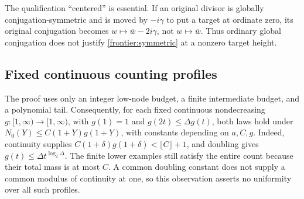 The qualification ``centered'' is essential. If an original divisor
is globally conjugation-symmetric and is moved by \(-i\gamma\)
to put a target at ordinate zero, its original conjugation becomes
\(w\mapsto\overline w-2i\gamma\), not
\(w\mapsto\overline w\). Thus ordinary global conjugation does
not justify \eqref{frontier:symmetric} at a nonzero target height.

\subsection{Fixed continuous counting profiles}
The proof uses only an integer low-node budget, a finite intermediate
budget, and a polynomial tail. Consequently, for each fixed continuous
nondecreasing \(g:[1,\infty)\to[1,\infty)\), with \(g(1)=1\)
and \(g(2t)\le\Delta g(t)\), both laws hold under
\(N_0(Y)\le C(1+Y)g(1+Y)\), with constants depending on
\(a,C,g\). Indeed, continuity supplies
\(C(1+\delta)g(1+\delta)<\lfloor C\rfloor+1\), and
doubling gives \(g(t)\le\Delta t^{\log_2\Delta}\).
The finite lower examples still satisfy the entire count because
their total mass is at most \(C\). A common doubling constant
does not supply a common modulus of continuity at one, so this
observation asserts no uniformity over all such profiles.
